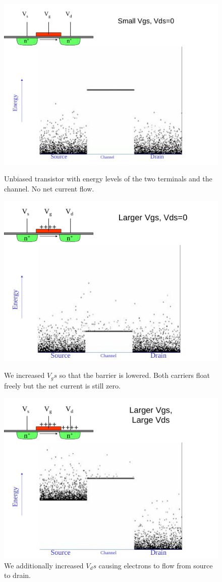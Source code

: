 \documentclass[main]{subfiles}
\begin{document}
\begin{figure}[H]
\centering
\includegraphics[scale=1]{figs/unbiased_transistor.pdf}
\caption{Unbiased transistor with energy levels of the two terminals and the channel. No net current flow.}
\includegraphics[scale=1]{figs/larger_vgs_transistor.pdf}
\caption{We increased $V_gs$ so that the barrier is lowered. Both carriers float freely but the net current is still zero.}
\includegraphics[scale=1]{figs/larger_vgs_vds_transistor.pdf}
\caption{We additionally increased $V_ds$ causing electrons to flow from source to drain.}
\end{figure}
\end{document}
